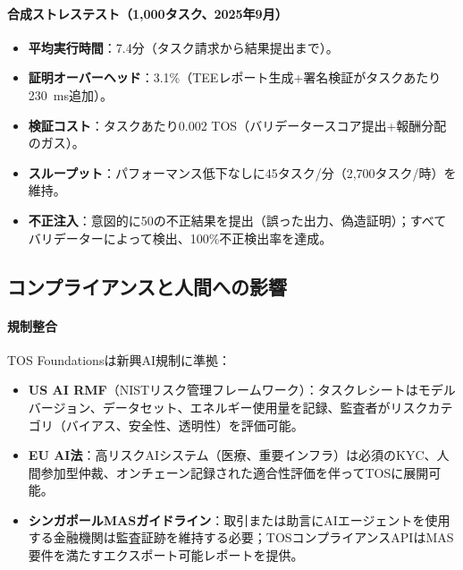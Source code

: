 \documentclass[11pt]{article}
\begin{document}
\paragraph{合成ストレステスト（1,000タスク、2025年9月）}
\begin{itemize}[noitemsep]
  \item \textbf{平均実行時間}：7.4分（タスク請求から結果提出まで）。
  \item \textbf{証明オーバーヘッド}：3.1\%（TEEレポート生成+署名検証がタスクあたり230~ms追加）。
  \item \textbf{検証コスト}：タスクあたり0.002 TOS（バリデータースコア提出+報酬分配のガス）。
  \item \textbf{スループット}：パフォーマンス低下なしに45タスク/分（2,700タスク/時）を維持。
  \item \textbf{不正注入}：意図的に50の不正結果を提出（誤った出力、偽造証明）；すべてバリデーターによって検出、100\%不正検出率を達成。
\end{itemize}

\subsection{コンプライアンスと人間への影響}
\paragraph{規制整合} TOS Foundationsは新興AI規制に準拠：
\begin{itemize}[noitemsep]
  \item \textbf{US AI RMF}（NISTリスク管理フレームワーク）：タスクレシートはモデルバージョン、データセット、エネルギー使用量を記録、監査者がリスクカテゴリ（バイアス、安全性、透明性）を評価可能。
  \item \textbf{EU AI法}：高リスクAIシステム（医療、重要インフラ）は必須のKYC、人間参加型仲裁、オンチェーン記録された適合性評価を伴ってTOSに展開可能。
  \item \textbf{シンガポールMASガイドライン}：取引または助言にAIエージェントを使用する金融機関は監査証跡を維持する必要；TOSコンプライアンスAPIはMAS要件を満たすエクスポート可能レポートを提供。
\end{itemize}
\end{document}
